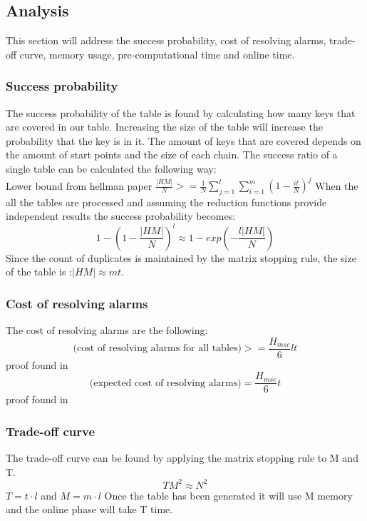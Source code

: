 \subsection{Analysis}
This section will address the success probability, cost of resolving alarms, trade-off curve, memory usage, pre-computational time and online time.

\subsubsection*{Success probability}
The success probability of the table is found by calculating how many keys that are covered in our table. Increasing the size of the table will increase the probability that the key is in it. The amount of keys that are covered depends on the amount of start points and the size of each chain. The success ratio of a single table can be calculated the following way:\\
Lower bound from hellman paper\cite{176}
$\frac{|HM|}{N}>=\frac{1}{N}\sum^{t}_{j=1}\sum^{m}_{i=1}(1-\frac{it}{N})^{j} $
When the all the tables are processed and assuming the reduction functions provide independent results the success probability becomes:
\[1-(1-\frac{|HM|}{N})^l\approx 1- exp(-\frac{l|HM|}{N})\]
Since the count of duplicates is maintained by the matrix stopping rule, the size of the table is :$|HM|\approx mt$.
\subsubsection{Cost of resolving alarms}
The cost of resolving alarms are the following:
\begin{equation}
\text{(cost of resolving alarms for all tables)}>=\frac{H_{msc}}{6}lt
\end{equation}
proof found in \cite{176}
\begin{equation}
\text{(expected cost of resolving alarms)}=\frac{H_{msc}}{6}t
\end{equation}
proof found in \cite{176}
\subsubsection{Trade-off curve}
The trade-off curve can be found by applying the matrix stopping rule to M and T.
\begin{equation}
TM^2\approx N^2
\end{equation}
$T=t \cdot l$ and $M=m\cdot l$
Once the table has been generated it will use M memory and the online phase will take T time.

